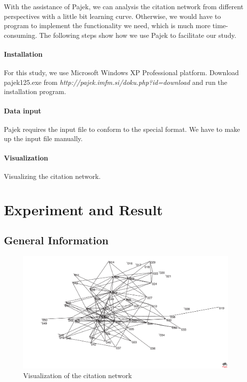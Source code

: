 With the assistance of Pajek, we can analysis the citation network from different perspectives with a little bit learning curve. Otherwise, we would have to program to implement the functionality we need, which is much more time-consuming. The following steps show how we use Pajek to facilitate our study.

\paragraph{Installation}
For this study, we use Microsoft Windows XP Professional platform. Download pajek125.exe from {\em http://pajek.imfm.si/doku.php?id=download} and run the installation program.
\paragraph{Data input}
Pajek requires the input file to conform to the special format. We have to make up the input file manually.   
\paragraph{Visualization}
Visualizing the citation network.



\section{Experiment and Result \label{S:Result}}
\subsection{General Information}

\begin{figure}[ht!]
\includegraphics [scale=0.6]{images/citation1}
\caption {Visualization of the citation network}
\label {F:graph}
\end{figure}

